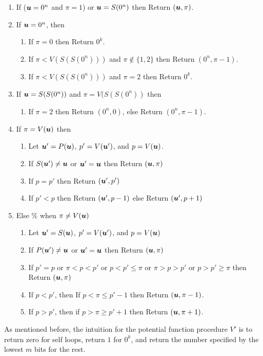 \begin{enumerate}
\item If ($\mbox{\boldmath $u$}=0^n$ and $\pi=1$) or $\mbox{\boldmath $u$}=S(0^n)$ then Return $(\mbox{\boldmath $u$},\pi)$. 
\item If $\mbox{\boldmath $u$}=0^n$, then 
\begin{enumerate}
\item If $\pi=0$ then Return $0^k$.
\item If $\pi<V(S(S(0^n)))$ and $\pi\notin \{1,2\}$ then Return $(0^n,\pi-1)$.
\item If $\pi<V(S(S(0^n)))$ and $\pi=2$ then Return $0^k$.
\end{enumerate}
\item If $\mbox{\boldmath $u$}=S(S(0^n))$ and $\pi=V(S(S(0^n))$ then 
\begin{enumerate}
\item If $\pi=2$ then Return $(0^n,0)$, else Return $(0^n,\pi-1)$. 
\end{enumerate}
\item If $\pi=V(\mbox{\boldmath $u$})$ then 
\begin{enumerate}
\item Let $\mbox{\boldmath $u$}'=P(\mbox{\boldmath $u$})$, $p'=V(\mbox{\boldmath $u$}')$, and $p=V(\mbox{\boldmath $u$})$. 
\item If $S(\mbox{\boldmath $u$}')\neq \mbox{\boldmath $u$}$ or $\mbox{\boldmath $u$}'=\mbox{\boldmath $u$}$ then Return $(\mbox{\boldmath $u$},\pi)$
\item If $p=p'$ then Return $(\mbox{\boldmath $u$}',p')$ 
\item If $p'<p$ then Return $(\mbox{\boldmath $u$}',p-1)$ else Return $(\mbox{\boldmath $u$}',p+1)$
\end{enumerate}
\item Else \% when $\pi \neq V(\mbox{\boldmath $u$})$
\begin{enumerate}
\item Let $\mbox{\boldmath $u$}'=S(\mbox{\boldmath $u$})$, $p'=V(\mbox{\boldmath $u$}')$, and $p=V(\mbox{\boldmath $u$})$
\item If $P(\mbox{\boldmath $u$}')\neq \mbox{\boldmath $u$}$ or $\mbox{\boldmath $u$}'=\mbox{\boldmath $u$}$ then Return $(\mbox{\boldmath $u$},\pi)$
\item If $p'=p$ or $\pi<p< p'$ or $p<p'\le \pi$ or $\pi>p> p'$ or $p>p'\ge \pi$ then Return $(\mbox{\boldmath $u$},\pi)$
\item If $p<p'$, then If $p<\pi\le p'-1$ then Return $(\mbox{\boldmath $u$},\pi-1)$. 
\item If $p>p'$, then if $p> \pi\ge p'+1$ then Return $(\mbox{\boldmath $u$},\pi+1)$. 
\end{enumerate}
\end{enumerate}

As mentioned before, the intuition for the potential function procedure $V'$ is to return zero for self loops, return $1$ for $0^k$, and return the number specified by the lowest $m$ bits for the rest. 
\medskip
\medskip


